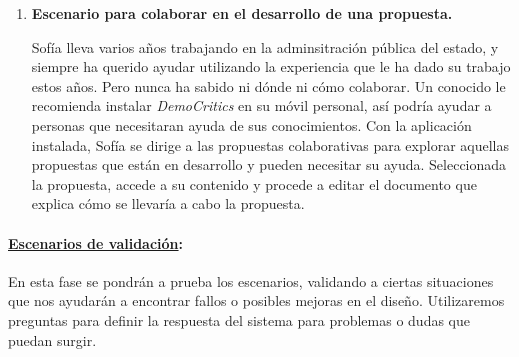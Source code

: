 \begin{enumerate}[label=\textbf{\Roman*}]
\item \textbf{Escenario para colaborar en el desarrollo de una propuesta.}

Sofía lleva varios años trabajando en la adminsitración pública del estado, y siempre ha querido ayudar utilizando la experiencia que le ha dado su trabajo estos años. Pero nunca ha sabido ni dónde ni cómo colaborar. Un conocido le recomienda instalar \textit{DemoCritics} en su móvil personal, así podría ayudar a personas que necesitaran ayuda de sus conocimientos. Con la aplicación instalada, Sofía se dirige a las propuestas colaborativas para explorar aquellas propuestas que están en desarrollo y pueden necesitar su ayuda. Seleccionada la propuesta, accede a su contenido y procede a editar el documento que explica cómo se llevaría a cabo la propuesta.

\end{enumerate}

\paragraph{\underline{Escenarios de validación}:}

En esta fase se pondrán a prueba los escenarios, validando a ciertas situaciones que nos ayudarán a encontrar fallos o posibles mejoras en el diseño. Utilizaremos preguntas para definir la respuesta del sistema para problemas o dudas que puedan surgir.

